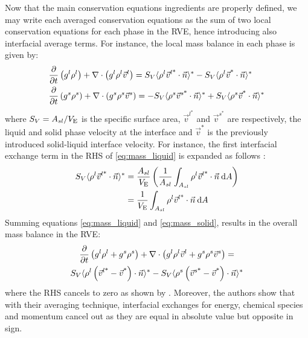 Now that the main conservation equations ingredients are properly defined, we may write each averaged conservation
equations as the sum of two local conservation equations for each phase in the RVE, hence introducing also interfacial average terms.
For instance, the local mass balance in each phase is given by:
\begin{subequations}
\begin{align}
\label{eq:mass_liquid}
& \frac{\partial}{\partial t} \left( {g^l} \rho^l \right)  + \nabla \cdot \left( {g^l} \rho^l \vec{v}^l \right) = S_V \langle \rho^l \vec{v}^{l \text{*}} \cdot \vec{n} \rangle^* - S_V \langle \rho^l \vec{v}^\text{*} \cdot \vec{n} \rangle^* \\
\label{eq:mass_solid}
& \frac{\partial}{\partial t} \left( {g^s} \rho^s \right)  + \nabla \cdot \left( {g^s} \rho^s \vec{v}^s \right) = - S_V \langle \rho^s \vec{v}^{s \text{*}} \cdot \vec{n} \rangle^* + S_V \langle \rho^s \vec{v}^\text{*} \cdot \vec{n} \rangle^*
\end{align}
\end{subequations}
where $S_V= A_{sl}/V_\text{E}$ is the specific surface area, $\vec{v}^{l^*}$ and $\vec{v}^{s^*}$ are respectively, the liquid 
and solid phase velocity at the interface and $\vec{v}^*$ is the previously introduced solid-liquid interface velocity. 
For instance, the first interfacial exchange term in the RHS of \cref{eq:mass_liquid} is expanded as follows \citep{dantzig_solidification_2009}:
\begin{subequations}
\begin{align}
S_V \langle \rho^l \vec{v}^{l \text{*}} \cdot \vec{n} \rangle^*
&= \frac{A_{sl}}{V_\text{E}} \left(  \frac{1}{A_{sl}} \int_{A_{sl}} \rho^l \vec{v}^{l \text{*}} \cdot \vec{n}\: \mathrm{d}A \right) \\
&= \frac{1}{V_\text{E}}  \int_{A_{sl}} \rho^l \vec{v}^{l \text{*}} \cdot \vec{n}\: \mathrm{d}A
\end{align}
\end{subequations}
Summing equations \eqref{eq:mass_liquid} and \eqref{eq:mass_solid}, results in the overall mass balance
in the RVE:
\begin{multline}
\label{eq:conservation_mass_local}
 \frac{\partial}{\partial t} \left( {g^l} \rho^l + {g^s} \rho^s \right)   +  \nabla \cdot \left( {g^l} \rho^l \vec{v}^l + {g^s} \rho^s \vec{v}^s \right) = \\  
	  S_V \langle \rho^l \left( \vec{v}^{l \text{*}}-\vec{v}^\text{*} \right) \cdot \vec{n} \rangle^*  
   -  S_V \langle \rho^s \left( \vec{v}^{s \text{*}}-\vec{v}^\text{*} \right) \cdot \vec{n} \rangle^*
\end{multline}
where the RHS cancels to zero as shown by \citet{ni_volume-averaged_1991}. Moreover, the authors show that with their averaging technique, 
interfacial exchanges for energy, chemical species and momentum cancel out as they are equal in absolute value but opposite in sign. 
